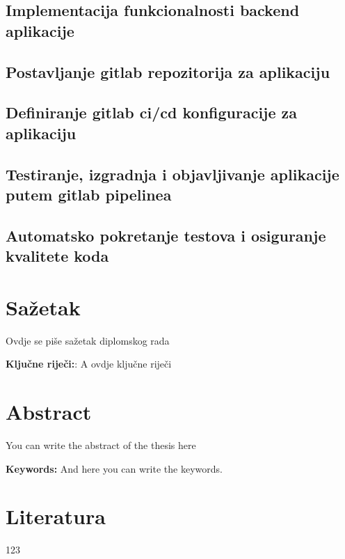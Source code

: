 \documentclass[a4paper,12pt,oneside]{article}
\begin{document}
\subsection{Implementacija funkcionalnosti backend aplikacije}


\subsection{Postavljanje gitlab repozitorija za aplikaciju}


\subsection{Definiranje gitlab ci/cd konfiguracije za aplikaciju}


\subsection{Testiranje, izgradnja i objavljivanje aplikacije putem gitlab pipelinea}


\subsection{Automatsko pokretanje testova i osiguranje kvalitete koda}








\newpage
\section*{Sa\v{z}etak}

Ovdje se pi\v{s}e sa\v{z}etak diplomskog rada

\bigskip
\noindent\textbf{Klju\v{c}ne rije\v{c}i:}: A ovdje klju\v{c}ne rije\v{c}i


\newpage
\section*{Abstract}

You can write the abstract of the thesis here

\bigskip
\noindent\textbf{Keywords:} And here you can write the keywords. 

\newpage
\section*{Literatura}
123
\printbibliography[heading=bibintoc]
\end{document}
